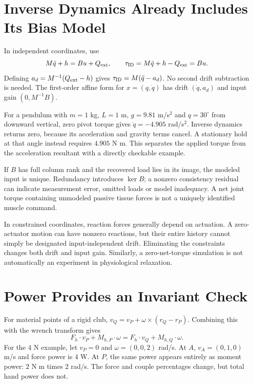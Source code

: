 \documentclass[11pt,a4paper]{article}
\begin{document}
\section{Inverse Dynamics Already Includes Its Bias Model}
In independent coordinates, use
\begin{equation}
M\ddot q+h=Bu+Q_{\rm ext},\qquad
\tau_{\rm ID}=M\ddot q+h-Q_{\rm ext}=Bu.
\end{equation}
Defining $a_d=M^{-1}(Q_{\rm ext}-h)$ gives
$\tau_{\rm ID}=M(\ddot q-a_d)$. No second drift subtraction is needed. The first-order affine form for $x=(q,\dot q)$ has drift $(\dot q,a_d)$ and input gain $(0,M^{-1}B)$.

For a pendulum with $m=1$ kg, $L=1$ m, $g=9.81$ m/s$^2$ and $q=30^\circ$ from downward vertical, zero pivot torque gives $\ddot q=-4.905$ rad/s$^2$. Inverse dynamics returns zero, because its acceleration and gravity terms cancel. A stationary hold at that angle instead requires $4.905$ N m. This separates the applied torque from the acceleration resultant with a directly checkable example.

If $B$ has full column rank and the recovered load lies in its image, the modeled input is unique. Redundancy introduces $\ker B$; a nonzero consistency residual can indicate measurement error, omitted loads or model inadequacy. A net joint torque containing unmodeled passive tissue forces is not a uniquely identified muscle command.

In constrained coordinates, reaction forces generally depend on actuation. A zero-actuator motion can have nonzero reactions, but their entire history cannot simply be designated input-independent drift. Eliminating the constraints changes both drift and input gain. Similarly, a zero-net-torque simulation is not automatically an experiment in physiological relaxation.

\section{Power Provides an Invariant Check}
For material points of a rigid club,
$v_Q=v_P+\omega\times(r_Q-r_P)$. Combining this with the wrench transform gives
\begin{equation}
F_h\cdot v_P+M_{h,P}\cdot\omega
=F_h\cdot v_Q+M_{h,Q}\cdot\omega.
\end{equation}
For the $4$ N example, let $v_P=0$ and $\omega=(0,0,2)$ rad/s. At $A$, $v_A=(0,1,0)$ m/s and force power is $4$ W. At $P$, the same power appears entirely as moment power: $2$ N m times $2$ rad/s. The force and couple percentages change, but total hand power does not.
\end{document}
